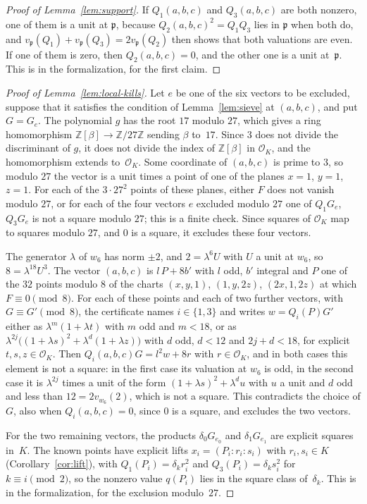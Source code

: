 \documentclass[11pt]{amsart}
\theoremstyle{definition}
\numberwithin{equation}{section}
\newcommand{\Z}{\mathbb{Z}}
\newcommand{\OK}{\mathcal{O}_K}
\begin{document}
\begin{proof}[Proof of Lemma~\ref{lem:support}]
If $Q_1(a,b,c)$ and $Q_3(a,b,c)$ are both nonzero, one of them is a unit at $\mathfrak p$, because $Q_2(a,b,c)^2=Q_1Q_3$ lies in $\mathfrak p$ when both do, and $v_{\mathfrak p}(Q_1)+v_{\mathfrak p}(Q_3)=2v_{\mathfrak p}(Q_2)$ then shows that both valuations are even. If one of them is zero, then $Q_2(a,b,c)=0$, and the other one is a unit at~$\mathfrak p$. This is  in the formalization, for the first claim.
\end{proof}

\begin{proof}[Proof of Lemma~\ref{lem:local-kills}]
Let $e$ be one of the six vectors to be excluded, suppose that it satisfies the condition of Lemma~\ref{lem:sieve} at $(a,b,c)$, and put $G=G_e$. The polynomial $g$ has the root $17$ modulo $27$, which gives a ring homomorphism $\Z[\beta]\to\Z/27\Z$ sending $\beta$ to~$17$. Since $3$ does not divide the discriminant of $g$, it does not divide the index of $\Z[\beta]$ in $\OK$, and the homomorphism extends to~$\OK$. Some coordinate of $(a,b,c)$ is prime to $3$, so modulo $27$ the vector is a unit times a point of one of the planes $x=1$, $y=1$, $z=1$. For each of the $3\cdot27^2$ points of these planes, either $F$ does not vanish modulo $27$, or for each of the four vectors $e$ excluded modulo $27$ one of $Q_1G_e$, $Q_3G_e$ is not a square modulo $27$; this is a finite check. Since squares of $\OK$ map to squares modulo $27$, and $0$ is a square, it excludes these four vectors.

The generator $\lambda$ of $w_6$ has norm $\pm2$, and $2=\lambda^6U$ with $U$ a unit at $w_6$, so $8=\lambda^{18}U^3$. The vector $(a,b,c)$ is $l\,P+8b'$ with $l$ odd, $b'$ integral and $P$ one of the $32$ points modulo $8$ of the charts $(x,y,1)$, $(1,y,2z)$, $(2x,1,2z)$ at which $F\equiv0\pmod 8$. For each of these points and each of two further vectors, with $G\equiv G'\pmod 8$, the certificate names $i\in\{1,3\}$ and writes $w=Q_i(P)G'$ either as $\lambda^{m}(1+\lambda t)$ with $m$ odd and $m<18$, or as $\lambda^{2j}\bigl((1+\lambda s)^2+\lambda^{d}(1+\lambda z)\bigr)$ with $d$ odd, $d<12$ and $2j+d<18$, for explicit $t,s,z\in\OK$. Then $Q_i(a,b,c)G=l^2w+8r$ with $r\in\OK$, and in both cases this element is not a square: in the first case its valuation at $w_6$ is odd, in the second case it is $\lambda^{2j}$ times a unit of the form $(1+\lambda s)^2+\lambda^{d}u$ with $u$ a unit and $d$ odd and less than $12=2v_{w_6}(2)$, which is not a square. This contradicts the choice of $G$, also when $Q_i(a,b,c)=0$, since $0$ is a square, and excludes the two vectors.

For the two remaining vectors, the products $\delta_0G_{e_0}$ and $\delta_1G_{e_1}$ are explicit squares in~$K$. The known points have explicit lifts $x_i=(P_i:r_i:s_i)$ with $r_i,s_i\in K$ (Corollary~\ref{cor:lift}), with $Q_1(P_i)=\delta_kr_i^2$ and $Q_3(P_i)=\delta_ks_i^2$ for $k\equiv i\pmod 2$, so the nonzero value $q(P_i)$ lies in the square class of~$\delta_k$. This is  in the formalization, for the exclusion modulo~$27$.
\end{proof}
\end{document}
